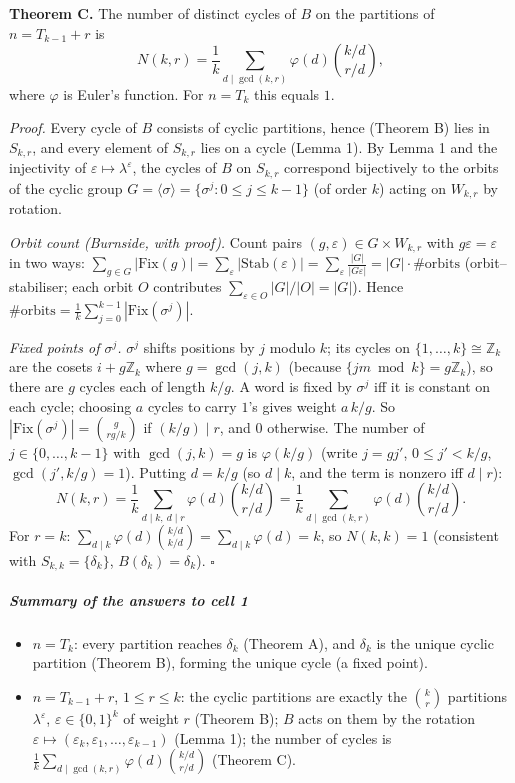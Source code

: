 \documentclass[11pt,a4paper]{article}
\providecommand{\tightlist}{\setlength{\itemsep}{0pt}\setlength{\parskip}{0pt}}
\begin{document}
\textbf{Theorem C.} The number of distinct cycles of \(B\) on the
partitions of \(n=T_{k-1}+r\) is
\[N(k,r)=\frac1k\sum_{d\mid\gcd(k,r)}\varphi(d)\binom{k/d}{r/d},\] where
\(\varphi\) is Euler's function. For \(n=T_k\) this equals \(1\).

\emph{Proof.} Every cycle of \(B\) consists of cyclic partitions, hence
(Theorem B) lies in \(S_{k,r}\), and every element of \(S_{k,r}\) lies
on a cycle (Lemma 1). By Lemma 1 and the injectivity of
\(\varepsilon\mapsto\lambda^\varepsilon\), the cycles of \(B\) on
\(S_{k,r}\) correspond bijectively to the orbits of the cyclic group
\(G=\langle\sigma\rangle=\{\sigma^j:0\le j\le k-1\}\) (of order \(k\))
acting on \(W_{k,r}\) by rotation.

\emph{Orbit count (Burnside, with proof).} Count pairs
\((g,\varepsilon)\in G\times W_{k,r}\) with \(g\varepsilon=\varepsilon\)
in two ways:
\(\sum_{g\in G}|\mathrm{Fix}(g)|=\sum_{\varepsilon}|\mathrm{Stab}(\varepsilon)|=\sum_{\varepsilon}\frac{|G|}{|G\varepsilon|}=|G|\cdot\#\text{orbits}\)
(orbit--stabiliser; each orbit \(O\) contributes
\(\sum_{\varepsilon\in O}|G|/|O|=|G|\)). Hence
\(\#\text{orbits}=\frac1k\sum_{j=0}^{k-1}|\mathrm{Fix}(\sigma^j)|\).

\emph{Fixed points of \(\sigma^j\).} \(\sigma^j\) shifts positions by
\(j\) modulo \(k\); its cycles on \(\{1,\dots,k\}\cong\mathbb Z_k\) are
the cosets \(i+g\mathbb Z_k\) where \(g=\gcd(j,k)\) (because
\(\{jm\bmod k\}=g\mathbb Z_k\)), so there are \(g\) cycles each of
length \(k/g\). A word is fixed by \(\sigma^j\) iff it is constant on
each cycle; choosing \(a\) cycles to carry \(1\)'s gives weight
\(a\,k/g\). So \(|\mathrm{Fix}(\sigma^j)|=\binom{g}{rg/k}\) if
\((k/g)\mid r\), and \(0\) otherwise. The number of
\(j\in\{0,\dots,k-1\}\) with \(\gcd(j,k)=g\) is \(\varphi(k/g)\) (write
\(j=gj'\), \(0\le j'<k/g\), \(\gcd(j',k/g)=1\)). Putting \(d=k/g\) (so
\(d\mid k\), and the term is nonzero iff \(d\mid r\)):
\[N(k,r)=\frac1k\sum_{d\mid k,\ d\mid r}\varphi(d)\binom{k/d}{r/d}=\frac1k\sum_{d\mid\gcd(k,r)}\varphi(d)\binom{k/d}{r/d}.\]
For \(r=k\):
\(\sum_{d\mid k}\varphi(d)\binom{k/d}{k/d}=\sum_{d\mid k}\varphi(d)=k\),
so \(N(k,k)=1\) (consistent with \(S_{k,k}=\{\delta_k\}\),
\(B(\delta_k)=\delta_k\)). \(\square\)

\subparagraph{Summary of the answers to cell
1}\label{summary-of-the-answers-to-cell-1}

\begin{itemize}
\tightlist
\item
  \(n=T_k\): every partition reaches \(\delta_k\) (Theorem A), and
  \(\delta_k\) is the unique cyclic partition (Theorem B), forming the
  unique cycle (a fixed point).
\item
  \(n=T_{k-1}+r\), \(1\le r\le k\): the cyclic partitions are exactly
  the \(\binom kr\) partitions \(\lambda^\varepsilon\),
  \(\varepsilon\in\{0,1\}^k\) of weight \(r\) (Theorem B); \(B\) acts on
  them by the rotation
  \(\varepsilon\mapsto(\varepsilon_k,\varepsilon_1,\dots,\varepsilon_{k-1})\)
  (Lemma 1); the number of cycles is
  \(\frac1k\sum_{d\mid\gcd(k,r)}\varphi(d)\binom{k/d}{r/d}\) (Theorem
  C).
\end{itemize}
\end{document}
